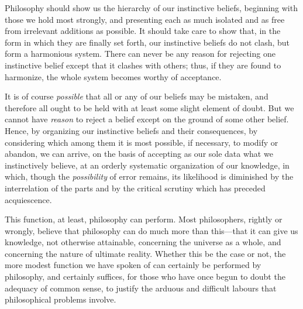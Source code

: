 \documentclass[oneside,letterpaper,12pt]{book}
\begin{document}
Philosophy should show us the hierarchy of our instinctive beliefs,
beginning with those we hold most strongly, and presenting each as much
isolated and as free from irrelevant additions as possible. It should
take care to show that, in the form in which they are finally set forth,
our instinctive beliefs do not clash, but form a harmonious system.
There can never be any reason for rejecting one instinctive belief
except that it clashes with others; thus, if they are found to
harmonize, the whole system becomes worthy of acceptance.

It is of course \emph{possible} that all or any of our beliefs may be
mistaken, and therefore all ought to be held with at least some slight
element of doubt. But we cannot have \emph{reason} to reject a belief
except on the ground of some other belief. Hence, by organizing our
instinctive beliefs and their consequences, by considering which among
them it is most possible, if necessary, to modify or abandon, we can
arrive, on the basis of accepting as our sole data what we instinctively
believe, at an orderly systematic organization of our knowledge, in
which, though the \emph{possibility} of error remains, its likelihood is
diminished by the interrelation of the parts and by the critical
scrutiny which has preceded acquiescence.

This function, at least, philosophy can perform. Most philosophers,
rightly or wrongly, believe that philosophy can do much more than
this---that it can give us knowledge, not otherwise attainable,
concerning the universe as a whole, and concerning the nature of
ultimate reality. Whether this be the case or not, the more modest
function we have spoken of can certainly be performed by philosophy, and
certainly suffices, for those who have once begun to doubt the adequacy
of common sense, to justify the arduous and difficult labours that
philosophical problems involve.

\protect\hypertarget{link2HCH0003}{}{}

\pagebreak
\end{document}
